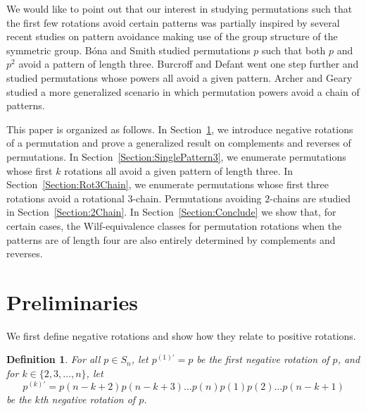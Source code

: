 \documentclass[10pt,a4paper]{amsart}
\newtheorem{definition}[theorem]{Definition}
\numberwithin{equation}{section}
\begin{document}
We would like to point out that our interest in studying permutations such that the first few rotations avoid certain patterns was partially inspired by several recent 
studies on pattern avoidance making use of the group structure of the symmetric group. B\'{o}na and Smith \cite{BonaSmith2019} studied permutations $p$ such that both $p$ and $p^2$ avoid a pattern of length three. Burcroff and Defant \cite{BurcroffDefant2020} went one step further and studied permutations whose powers all avoid a given pattern. Archer and Geary \cite{ArcherGeary2023} studied a more generalized scenario in which permutation powers avoid a chain of patterns.

This paper is organized as follows. In Section~\ref{Section:Pre}, we introduce negative rotations of a permutation and prove a generalized result on complements and reverses of permutations. In Section~\ref{Section:SinglePattern3}, we enumerate permutations whose first $k$ rotations all avoid a given pattern of length three. In Section~\ref{Section:Rot3Chain}, we enumerate permutations whose first three rotations avoid a rotational 3-chain. Permutations avoiding $2$-chains are studied in Section~\ref{Section:2Chain}. In Section~\ref{Section:Conclude} we show that, for certain cases, the Wilf-equivalence classes for permutation rotations when the patterns are of length four are also entirely determined by complements and reverses.

\section{Preliminaries}\label{Section:Pre}
We first define negative rotations and show how they relate to positive rotations.

\begin{definition}
    For all $p\in S_n$, let $p^{(1)'}=p$ be the \textit{first negative rotation} of $p$, and for $k\in\{2,3,\ldots,n\}$, let
\[p^{(k)'}=p(n-k+2)p(n-k+3)\ldots p(n) p(1) p(2)\ldots p(n-k+1)\] be the \textit{$k$th negative rotation} of $p$.
\end{definition}
\end{document}
